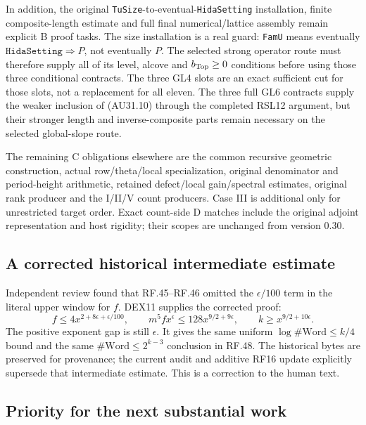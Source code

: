 In addition, the original \texttt{TuSize}-to-eventual-\texttt{HidaSetting}
installation, finite composite-length estimate and full final
numerical/lattice assembly remain explicit B proof tasks.
The size installation is a real guard: \texttt{FamU} means
eventually $\texttt{HidaSetting}\Rightarrow P$, not eventually $P$.
The selected strong operator route must therefore supply all of its
level, alcove and $b_{\rm Top}\ge0$ conditions before using those
three conditional contracts.
The three GL4 slots are an exact sufficient cut for those slots,
not a replacement for all eleven. The three full GL6 contracts
supply the weaker inclusion of (AU31.10) through the completed
RSL12 argument, but their stronger length and inverse-composite
parts remain necessary on the selected global-slope route.

The remaining C obligations elsewhere are the common recursive
geometric construction, actual row/theta/local specialization,
original denominator and period-height arithmetic, retained
defect/local gain/spectral estimates, original rank producer and
the I/II/V count producers. Case III is additional only for
unrestricted target order. Exact count-side D matches include the
original adjoint representation and host rigidity; their scopes
are unchanged from version 0.30.

\subsection{A corrected historical intermediate estimate}

Independent review found that RF.45--RF.46 omitted the
$\epsilon/100$ term in the literal upper window for $f$.
DEX11 supplies the corrected proof:
\[
 f\le4x^{2+8\epsilon+\epsilon/100},\qquad
 m^5fx^\epsilon\le128x^{9/2+9\epsilon},\qquad
 k\ge x^{9/2+10\epsilon}.
                                                               \tag{AU31.11}
\]
The positive exponent gap is still $\epsilon$. It gives the same
uniform $\log\#\mathrm{Word}\le k/4$ bound and the same
$\#\mathrm{Word}\le2^{k-3}$ conclusion in RF.48.
The historical bytes are preserved for provenance; the current
audit and additive RF16 update explicitly supersede that
intermediate estimate. This is a correction to the human text.

\subsection{Priority for the next substantial work}

